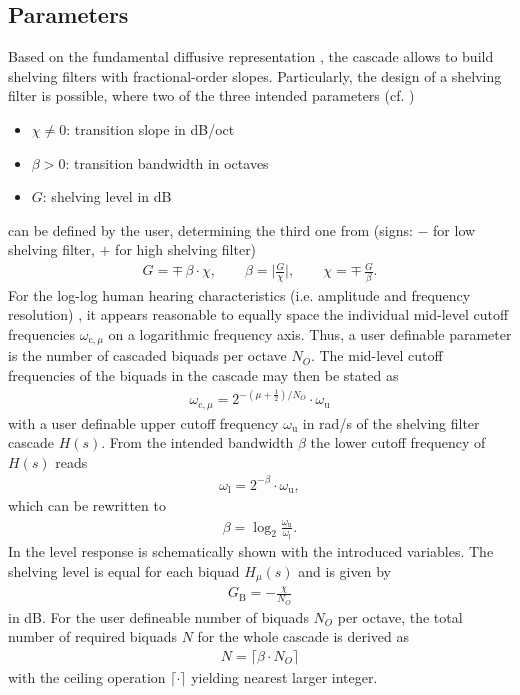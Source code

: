 \subsection{Parameters}
%
Based on the fundamental diffusive representation
\cite[Sec. 3.2]{Helie2013},
the cascade  allows to build shelving filters with fractional-order slopes.
%
Particularly, the design of a shelving filter is possible, where two of the
three intended parameters (cf. )
%
\begin{itemize}
\setlength\itemsep{-0.1em}
\item $\chi\neq0$: transition slope in dB/oct
\item $\beta>0$: transition bandwidth in octaves
\item $G$: shelving level in dB
\end{itemize}
%
can be defined by the user, determining the third one from (signs: $-$ for low
shelving filter, $+$ for high shelving filter)
\begin{align}
\label{eq:parameter_triplet}
G = \mp\,\beta \cdot \chi,\qquad
\beta = \bigg|\frac{G}{\chi}\bigg|,\qquad
\chi = \mp\,\frac{G}{\beta}.
\end{align}
%
%
%
For the log-log human hearing characteristics (i.e. amplitude and
frequency resolution) \cite{Fastl2007},
it appears reasonable to equally space the individual mid-level cutoff
frequencies $\omega_{\mathrm{c},\mu}$ on a logarithmic frequency axis.
%
Thus, a user definable parameter is the number of cascaded biquads per
octave $N_{O}$.
%
%
%
%
%
%
\NewL The mid-level cutoff frequencies of the biquads in the cascade 
may then be stated as
%
\begin{align}
\omega_{\mathrm{c},\mu} = 2^{-(\mu+\frac{1}{2})/N_{O}} \cdot \omega_\mathrm{u}
\end{align}
%
with a user definable upper cutoff frequency $\omega_\mathrm{u}$ in rad/s of the
shelving filter cascade $H(s)$.
%
From the intended bandwidth $\beta$ the lower cutoff frequency of $H(s)$ reads
\begin{align}
\omega_\mathrm{l} = 2^{-\beta} \cdot \omega_\mathrm{u},
\end{align}
%
which can be rewritten to
\begin{align}
\beta = \log_2 \frac{\omega_\mathrm{u}}{\omega_\mathrm{l}}.
\end{align}
%
In  the level response
is schematically shown with the introduced variables.
%
The shelving level is equal for each biquad $H_\mu(s)$ and is given by
\begin{align}
\label{eq:Gb}
G_\mathrm{B} = - \frac{\chi}{N_{O}}
\end{align}
in dB.
%
For the user defineable number of biquads $N_O$ per octave,
the total number of required biquads
$N$ for the whole cascade is derived as
\begin{align}
\label{eq:ceil_function}
N = \lceil \beta \cdot N_{O} \rceil
\end{align}
with the ceiling operation $\lceil \cdot \rceil$ yielding nearest larger integer.
%
%
%
%
%
%
